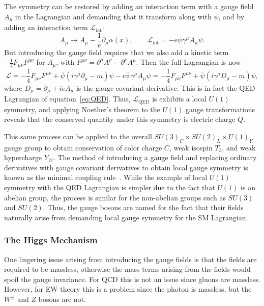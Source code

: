 The symmetry can be restored by adding an interaction term with a gauge field $A_\mu$ in the Lagrangian and demanding that it transform along with $\psi$, and by adding an interaction term $\mathcal{L}_\mathrm{int}$:
\begin{equation}
  A_\mu\to A_\mu-\frac{1}{e}\partial_\mu\alpha(x),\qquad \mathcal{L}_\mathrm{int}=-e\bar{\psi}\gamma^\mu A_\mu\psi.
\end{equation}
But introducing the gauge field requires that we also add a kinetic term $-\frac{1}{4}F_{\mu\nu}F^{\mu\nu}$ for $A_\mu$, with $F^{\mu\nu}=\partial^\mu A^\nu-\partial^\nu A^\mu$.
Then the full Lagrangian is now
\begin{equation}
  \mathcal{L}=-\frac{1}{4}F_{\mu\nu}F^{\mu\nu}+\bar{\psi}(i\gamma^\mu\partial_\mu-m)\psi-e\bar{\psi}\gamma^\mu A_\mu\psi=-\frac{1}{4}F_{\mu\nu}F^{\mu\nu}+\bar{\psi}(i\gamma^\mu D_\mu-m)\psi,
\end{equation}
where $D_\mu=\partial_\mu+ieA_\mu$ is the gauge covariant derivative.
This is in fact the QED Lagrangian of equation~\ref{eq:QED}.
Thus, $\mathcal{L}_\mathrm{QED}$ is exhibits a local $U(1)$ symmetry, and applying Noether's theorem to the $U(1)$ gauge transformations reveals that the conserved quantity under this symmetry is electric charge $Q$.

This same process can be applied to the overall $SU(3)_C\times SU(2)_L\times U(1)_Y$ gauge group to obtain conservation of color charge $C$, weak isospin $T_3$, and weak hypercharge $Y_W$.
The method of introducing a gauge field and replacing ordinary derivatives with gauge covariant derivatives to obtain local gauge symmetry is known as the minimal coupling rule~\cite{cheng1984}.
While the example of local $U(1)$ symmetry with the QED Lagrangian is simpler due to the fact that $U(1)$ is an abelian group, the process is similar for the non-abelian groups such as $SU(3)$ and $SU(2)$.
Thus, the gauge bosons are named for the fact that their fields naturally arise from demanding local gauge symmetry for the SM Lagrangian.

\subsubsection{The Higgs Mechanism}

One lingering issue arising from introducing the gauge fields is that the fields are required to be massless, otherwise the mass terms arising from the fields would spoil the gauge invariance.
For QCD this is not an issue since gluons are massless.
However, for EW theory this is a problem since the photon is massless, but the $W^\pm$ and $Z$ bosons are not.

